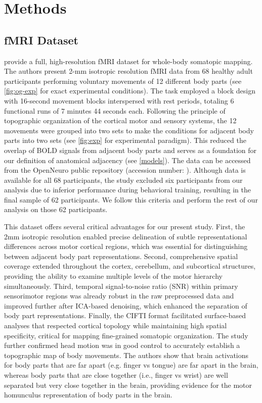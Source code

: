\documentclass{article}
\begin{document}
\section{Methods}
\subsection{fMRI Dataset}
\cite{Donahue2018} provide a full, high-resolution fMRI dataset for whole-body somatopic mapping. The authors present 2-mm isotropic resolution fMRI data from 68 healthy adult participants performing voluntary movements of 12 different body parts (see \ref{fig:og-exp} for exact experimental conditions). The task employed a block design with 16-second movement blocks interspersed with rest periods, totaling 6 functional runs of 7 minutes 44 seconds each. Following the principle of topographic organization of the cortical motor and sensory systems, the 12 movements were grouped into two sets to make the conditions for adjacent body parts into two sets (see \ref{fig:exp} for experimental paradigm). This reduced the overlap of BOLD signals from adjacent body parts and serves as a foundation for our definition of anatomical adjacency (see \ref{models}). The data can be accessed from the OpenNeuro public repository (accession number: \cite{data}). Although data is available for all 68 participants, the study excluded six participants from our analysis due to inferior performance during behavioral training, resulting in the final sample of 62 participants. We follow this criteria and perform the rest of our analysis on those 62 participants. 

This dataset offers several critical advantages for our present study. First, the 2mm isotropic resolution enabled precise delineation of subtle representational differences across motor cortical regions, which was essential for distinguishing between adjacent body part representations. Second, comprehensive spatial coverage extended throughout the cortex, cerebellum, and subcortical structures, providing the ability to examine multiple levels of the motor hierarchy simultaneously. Third, temporal signal-to-noise ratio (SNR) within primary sensorimotor regions was already robust in the raw preprocessed data and improved further after ICA-based denoising, which enhanced the separation of body part representations. Finally, the CIFTI format facilitated surface-based analyses that respected cortical topology while maintaining high spatial specificity, critical for mapping fine-grained somatopic organization. The study further confirmed head motion was in good control to accurately establish a topographic map of body movements. The authors show that brain activations for body parts that are far apart (e.g. finger vs tongue) are far apart in the brain, whereas body parts that are close together (i.e., finger vs wrist) are well separated but very close together in the brain, providing evidence for the motor homunculus representation of body parts in the brain. 
\end{document}
